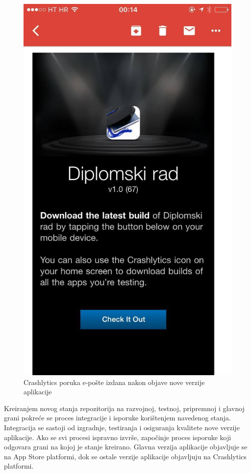 \documentclass[times, utf8, diplomski, numeric]{fer}
\begin{document}
\begin{figure}[b!]
\centering
\includegraphics[scale=0.3]{CrashlyticsEmail}
\caption{Crashlytics poruka e-pošte izdana nakon objave nove verzije aplikacije}
\label{fig:CrashlyticsEmail}
\end{figure}

Kreiranjem novog stanja repozitorija na razvojnoj, testnoj, pripremnoj i glavnoj grani pokreće se proces integracije i isporuke korištenjem navedenog stanja. Integracija se sastoji od izgradnje, testiranja i osiguranja kvalitete nove verzije aplikacije. Ako se svi procesi ispravno izvrše, započinje proces isporuke koji odgovara grani na kojoj je stanje kreirano. Glavna verzija aplikacije objavljuje se na App Store platformi, dok se ostale verzije aplikacije objavljuju na Crashlytics platformi.
\end{document}
